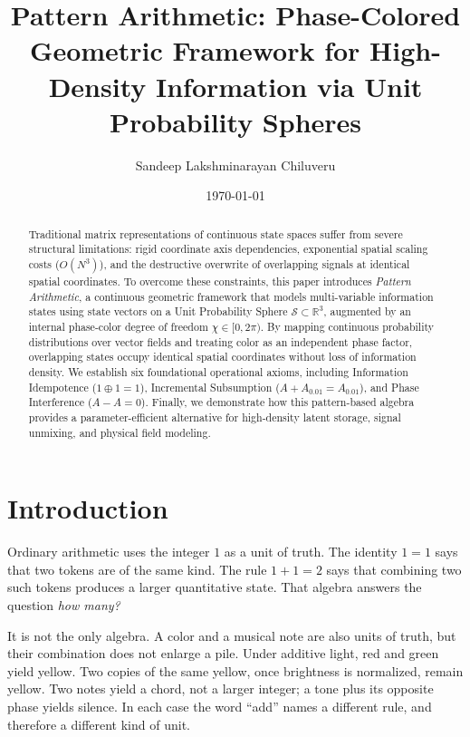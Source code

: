 \documentclass[12pt, a4paper]{article}
\title{Pattern Arithmetic: Phase-Colored Geometric Framework for High-Density Information via Unit Probability Spheres}
\author{Sandeep Lakshminarayan Chiluveru}
\date{\today}
\begin{document}
\maketitle

\begin{abstract}
Traditional matrix representations of continuous state spaces suffer from severe structural limitations: rigid coordinate axis dependencies, exponential spatial scaling costs ($O(N^3)$), and the destructive overwrite of overlapping signals at identical spatial coordinates. To overcome these constraints, this paper introduces \textit{Pattern Arithmetic}, a continuous geometric framework that models multi-variable information states using state vectors on a Unit Probability Sphere $\mathcal{S} \subset \mathbb{R}^3$, augmented by an internal phase-color degree of freedom $\chi \in [0, 2\pi)$. By mapping continuous probability distributions over vector fields and treating color as an independent phase factor, overlapping states occupy identical spatial coordinates without loss of information density. We establish six foundational operational axioms, including Information Idempotence ($1 \oplus 1 = 1$), Incremental Subsumption ($A + A_{0.01} = A_{0.01}$), and Phase Interference ($A - A = 0$). Finally, we demonstrate how this pattern-based algebra provides a parameter-efficient alternative for high-density latent storage, signal unmixing, and physical field modeling.
\end{abstract}

\section{Introduction}

Ordinary arithmetic uses the integer $1$ as a unit of truth.
The identity $1=1$ says that two tokens are of the same kind.
The rule $1+1=2$ says that combining two such tokens produces a
larger quantitative state. That algebra answers the question
\emph{how many?}

It is not the only algebra. A color and a musical note are also
units of truth, but their combination does not enlarge a pile.
Under additive light, red and green yield yellow. Two copies of
the same yellow, once brightness is normalized, remain yellow.
Two notes yield a chord, not a larger integer; a tone plus its
opposite phase yields silence. In each case the word ``add''
names a different rule, and therefore a different kind of unit.
\end{document}
